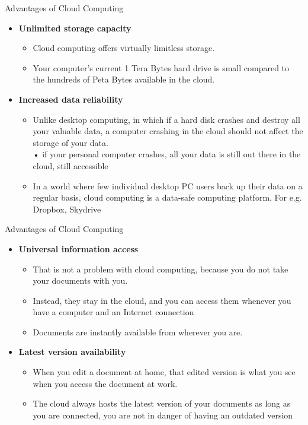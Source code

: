 \documentclass{SKP-beamer}
\begin{document}
\begin{frame}{Advantages of Cloud Computing}
	\begin{itemize}
		
		\item  \textbf{Unlimited storage capacity}
		\begin{itemize}
			\item  Cloud computing offers virtually limitless storage.
			\item  Your computer's current 1 Tera Bytes hard drive is small compared to the hundreds of Peta 
			Bytes available in the cloud.
			
		\end{itemize}
		\item  \textbf{Increased data reliability}
		\begin{itemize}
			\item  Unlike desktop computing, in which if a hard disk crashes and destroy all your 
			valuable data, a computer crashing in the cloud should not affect the storage of your 
			data. \\
			• if your personal computer crashes, all your data is still out there in the cloud, still accessible
			\item  In a world where few individual desktop PC users back up their data on a regular basis, 
			cloud computing is a data-safe computing platform. For e.g. Dropbox, Skydrive
			
		\end{itemize}
	\end{itemize}
\end{frame}

\begin{frame}{Advantages of Cloud Computing}
	\begin{itemize}
		
		\item  \textbf{Universal information access}
		\begin{itemize}
			\item  That is not a problem with cloud computing, because you do not take your
			documents with you.
			\item  Instead, they stay in the cloud, and you can access them whenever you have a 
			computer and an Internet connection
			\item  Documents are instantly available from wherever you are.
			
		\end{itemize}
		\item  \textbf{Latest version availability}
		\begin{itemize}
			\item  When you edit a document at home, that edited version is what you see when
			you access the document at work.
			\item  The cloud always hosts the latest version of your documents as long as you are 
			connected, you are not in danger of having an outdated version
			
		\end{itemize}
	\end{itemize}
\end{frame}
\end{document}
